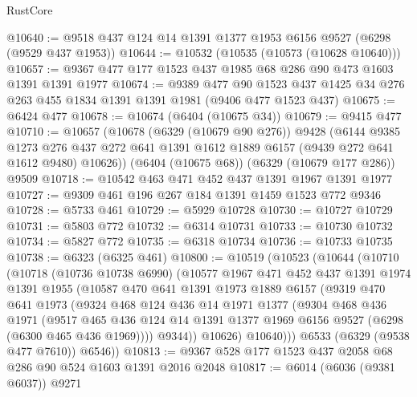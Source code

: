 \begin{lexlean}{RustCore}
\begin{coremodule}
@10640 := @9518 @437 @124 @14 @1391 @1377 @1953 @6156 @9527 (@6298 (@9529 @437 @1953))
@10644 := @10532 (@10535 (@10573 (@10628 @10640)))
@10657 := @9367 @477 @177 @1523 @437 @1985 @68 @286 @90 @473 @1603 @1391 @1391 @1977
@10674 := @9389
    @477
    @90
    @1523
    @437
    @1425
    @34
    @276
    @263
    @455
    @1834
    @1391
    @1391
    @1981
    (@9406 @477 @1523 @437)
@10675 := @6424 @477
@10678 := @10674 (@6404 (@10675 @34))
@10679 := @9415 @477
@10710 := @10657
    (@10678
      (@6329 (@10679 @90 @276))
      @9428
      (@6144
        @9385
        @1273
        @276
        @437
        @272
        @641
        @1391
        @1612
        @1889
        @6157
        (@9439 @272 @641 @1612 @9480)
        @10626))
    (@6404 (@10675 @68))
    (@6329 (@10679 @177 @286))
    @9509
@10718 := @10542 @463 @471 @452 @437 @1391 @1967 @1391 @1977
@10727 := @9309 @461 @196 @267 @184 @1391 @1459 @1523 @772 @9346
@10728 := @5733 @461
@10729 := @5929 @10728
@10730 := @10727 @10729
@10731 := @5803 @772
@10732 := @6314 @10731
@10733 := @10730 @10732
@10734 := @5827 @772
@10735 := @6318 @10734
@10736 := @10733 @10735
@10738 := @6323 (@6325 @461)
@10800 := @10519
    (@10523
      (@10644
        (@10710
          (@10718
            (@10736 @10738 @6990)
            (@10577
              @1967
              @471
              @452
              @437
              @1391
              @1974
              @1391
              @1955
              (@10587
                @470
                @641
                @1391
                @1973
                @1889
                @6157
                (@9319
                  @470
                  @641
                  @1973
                  (@9324
                    @468
                    @124
                    @436
                    @14
                    @1971
                    @1377
                    (@9304
                      @468
                      @436
                      @1971
                      (@9517
                        @465
                        @436
                        @124
                        @14
                        @1391
                        @1377
                        @1969
                        @6156
                        @9527
                        (@6298 (@6300 @465 @436 @1969))))
                    @9344))
                @10626)
              @10640)))
        @6533
        (@6329 (@9538 @477 @7610))
        @6546))
@10813 := @9367 @528 @177 @1523 @437 @2058 @68 @286 @90 @524 @1603 @1391 @2016 @2048
@10817 := @6014 (@6036 (@9381 @6037)) @9271

\end{coremodule}
\end{lexlean}
